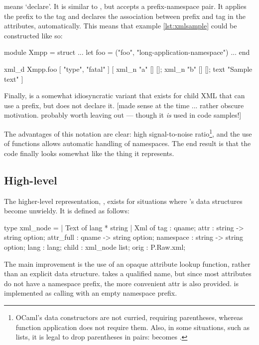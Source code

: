  means `declare'. It is similar to , but accepts a prefix-namespace pair. It applies the prefix to the tag and declares the association between prefix and tag in the attributes, automatically. This means that example \ref{lst:xmlsample} could be constructed like so:

\begin{ocaml}
module Xmpp = struct
  ...
  let foo = ("foo", "long-application-namespace")
  ...
end

xml_d Xmpp.foo [ "type", "fatal" ] [
  xml_n "a" [] [];
  xml_n "b" [] [];
  text "Sample text"
]
\end{ocaml}

Finally,  is a somewhat idiosyncratic variant that exists for child XML that can use a prefix, but does not declare it. [made sense at the time ... rather obscure motivation. probably worth leaving out --- though it \emph{is} used in code samples!]

The advantages of this notation are clear: high signal-to-noise ratio\footnote{OCaml's data constructors are not curried, requiring parentheses, whereas function application does not require them. Also, in some situations, such as lists, it is legal to drop parentheses in pairs: \code{[ (x,y); (z,w) ]} becomes \code{[ x,y; z,w ]}.}, and the use of functions allows automatic handling of namespaces. The end result is that the code finally looks somewhat like the thing it represents.

\subsection{High-level }
The higher-level representation, , exists for situations where 's data structures become unwieldy. It is defined as follows:

\begin{ocaml}
type xml_node =
| Text of lang * string
| Xml of {
  tag    : qname;
  attr   : string -> string option;
  attr_full : qname -> string option;
  namespace : string -> string option;
  lang  : lang;
  child : xml_node list;
  orig  : P.Raw.xml;
}
\end{ocaml}

The main improvement is the use of an opaque attribute lookup function, rather than an explicit data structure.  takes a qualified name, but since most attributes do not have a namespace prefix, the more convenient attr is also provided.  is implemented as calling  with an empty namespace prefix.

